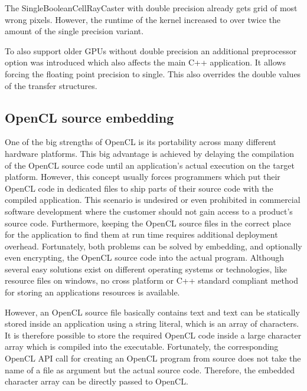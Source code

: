 The SingleBooleanCellRayCaster with double precision already gets grid of most wrong pixels. However, the runtime of the kernel increased to over twice the amount of the single precision variant.

To also support older GPUs without double precision an additional preprocessor option was introduced which also affects the main C++ application. It allows forcing the floating point precision to single. This also overrides the double values of the transfer structures.

\subsection{OpenCL source embedding}

One of the big strengths of OpenCL is its portability across many different hardware platforms. This big advantage is achieved by delaying the compilation of the OpenCL source code until an application's actual execution on the target platform. However, this concept usually forces programmers which put their OpenCL code in dedicated files to ship parts of their source code with the compiled application. This scenario is undesired or even prohibited in commercial software development where the customer should not gain access to a product's source code. Furthermore, keeping the OpenCL source files in the correct place for the application to find them at run time requires additional deployment overhead. Fortunately, both problems can be solved by embedding, and optionally even encrypting, the OpenCL source code into the actual program. Although several easy solutions exist on different operating systems or technologies, like resource files on windows, no cross platform or C++ standard compliant method for storing an applications resources is available.

However, an OpenCL source file basically contains text and text can be statically stored inside an application using a string literal, which is an array of characters. It is therefore possible to store the required OpenCL code inside a large character array which is compiled into the executable. Fortunately, the corresponding OpenCL API call for creating an OpenCL program from source does not take the name of a file as argument but the actual source code. Therefore, the embedded character array can be directly passed to OpenCL.

